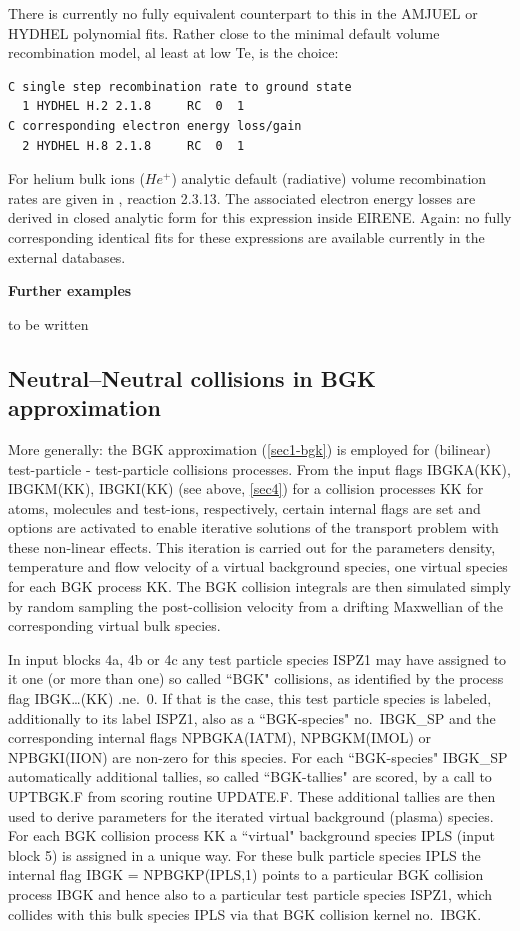 There is currently no fully equivalent counterpart to this in the AMJUEL or
HYDHEL polynomial fits.
Rather close to the minimal default volume recombination model, al least at low
Te, is the choice:

\begin{lstlisting}
C single step recombination rate to ground state
  1 HYDHEL H.2 2.1.8     RC  0  1
C corresponding electron energy loss/gain
  2 HYDHEL H.8 2.1.8     RC  0  1
\end{lstlisting}

For helium bulk ions ($He^+$) analytic default (radiative) volume recombination
rates are given in \cite{kn:Janev}, reaction 2.3.13.
The associated electron energy losses are derived in closed analytic form for
this expression inside EIRENE.
Again: no fully corresponding identical fits for these expressions are
available currently in the external databases.

\textbf{Further examples}

to be written

\subsection{Neutral--Neutral collisions in BGK approximation}\label{sec4-bgk}

More generally: the \ac{BGK} approximation (\cref{sec1-bgk}) is employed for
(bilinear) test-particle  -  test-particle collisions processes.
From the input flags IBGKA(KK), IBGKM(KK), IBGKI(KK) (see above, \cref{sec4})
for a collision processes KK for atoms, molecules and test-ions, respectively,
certain internal flags are set and options are activated to enable iterative
solutions of the transport problem with these non-linear effects.
This iteration is carried out for the parameters density, temperature and flow
velocity of a virtual background species, one virtual species for each \ac{BGK}
process KK.
The \ac{BGK} collision integrals are then simulated simply by random sampling
the post-collision velocity from a drifting Maxwellian of the corresponding
virtual bulk species.

In input blocks 4a, 4b or 4c any test particle species ISPZ1 may have assigned
to it one (or more than one) so called ``\acs{BGK}" collisions, as identified
by the process flag IBGK\dots(KK) .ne.\ 0.
If that is the case, this test particle species is labeled, additionally to its
label ISPZ1, also as a ``\acs{BGK}-species" no.\ IBGK\_SP and the corresponding
internal flags NPBGKA(IATM), NPBGKM(IMOL) or NPBGKI(IION) are non-zero for this
species.
For each ``\acs{BGK}-species" IBGK\_SP automatically additional tallies, so
called ``\acs{BGK}-tallies" are scored, by a call to UPTBGK.F from scoring
routine UPDATE.F.
These additional tallies are then used to derive parameters for the iterated
virtual background (plasma) species.
For each \ac{BGK} collision process KK a ``virtual" background species IPLS
(input block 5) is assigned in a unique way.
For these bulk particle species IPLS the internal flag IBGK = NPBGKP(IPLS,1)
points to a particular \acs{BGK} collision process IBGK and hence also to a
particular test particle species ISPZ1, which collides with this bulk species
IPLS via that \acs{BGK} collision kernel no.\ IBGK.

